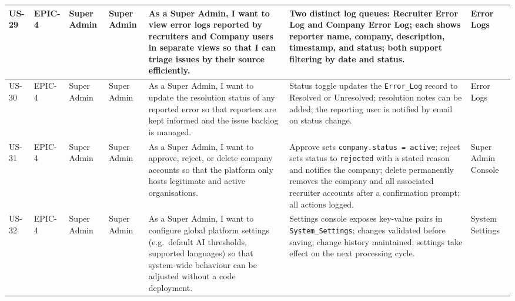 \begin{longtable}{|p{0.8cm}|p{1.0cm}|p{1.2cm}|p{1.4cm}|p{4.2cm}|p{4.2cm}|p{1.8cm}|}
\rowcolor{nhRow4}
US-29 & EPIC-4 & Super Admin & Super Admin &
As a Super Admin, I want to view error logs reported by recruiters and Company users in separate views so that I can triage issues by their source efficiently. &
Two distinct log queues: Recruiter Error Log and Company Error Log; each shows reporter name, company, description, timestamp, and status; both support filtering by date and status. & Error Logs \\
\hline

\rowcolor{nhRow4}
US-30 & EPIC-4 & Super Admin & Super Admin &
As a Super Admin, I want to update the resolution status of any reported error so that reporters are kept informed and the issue backlog is managed. &
Status toggle updates the \texttt{Error\_Log} record to Resolved or Unresolved; resolution notes can be added; the reporting user is notified by email on status change. & Error Logs \\
\hline

\rowcolor{nhRow4}
US-31 & EPIC-4 & Super Admin & Super Admin &
As a Super Admin, I want to approve, reject, or delete company accounts so that the platform only hosts legitimate and active organisations. &
Approve sets \texttt{company.status = active}; reject sets status to \texttt{rejected} with a stated reason and notifies the company; delete permanently removes the company and all associated recruiter accounts after a confirmation prompt; all actions logged. & Super Admin Console \\
\hline

\rowcolor{nhRow4}
US-32 & EPIC-4 & Super Admin & Super Admin &
As a Super Admin, I want to configure global platform settings (e.g.\ default AI thresholds, supported languages) so that system-wide behaviour can be adjusted without a code deployment. &
Settings console exposes key-value pairs in \texttt{System\_Settings}; changes validated before saving; change history maintained; settings take effect on the next processing cycle. & System Settings \\
\hline

\end{longtable}

\normalsize

\setlength{\tabcolsep}{6pt}
\renewcommand{\arraystretch}{1.0}



